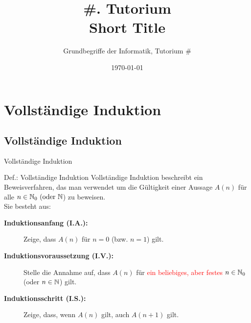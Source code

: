 



\title[Short Title]{\#. Tutorium\\ Short Title}
\subtitle{Grundbegriffe der Informatik, Tutorium \#\mytutnumber}
\date{\today}


\titleframe
\roadmap

\section{Vollständige Induktion}
\subsection{Vollständige Induktion}
\begin{frame}{Vollständige Induktion}
	\begin{block}{Def.: Vollständige Induktion}
		Vollständige Induktion beschreibt ein Beweisverfahren, das man verwendet um die Gültigkeit einer Aussage \(A(n)\) für alle \(n \in \mathbb{N}_{0} \text{ (oder } \mathbb{N}\)) zu beweisen.\\
		\pause
		Sie besteht aus:
		\begin{description}
			\item [\textbf{Induktionsanfang (I.A.):}] Zeige, dass \(A(n)\) für \(n=0\) (bzw. \(n=1\)) gilt.\pause
			\item [\textbf{Induktionsvoraussetzung (I.V.):}] Stelle die Annahme auf, dass \(A(n)\) für \textcolor{red}{ein beliebiges, aber festes} \(n \in \mathbb{N}_{0}\) (oder \(n \in \mathbb{N}\)) gilt.\pause
			\item [\textbf{Induktionsschritt (I.S.):}] Zeige, dass, wenn \(A(n)\) gilt, auch \(A(n+1)\) gilt.
		\end{description}
	\end{block}
\end{frame}

\section{}
\questionframe
\lastframe
